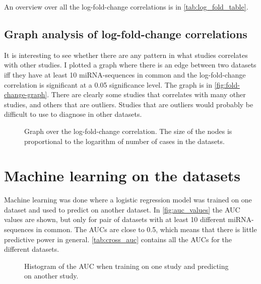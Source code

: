 An overview over all the log-fold-change correlations is in \autoref{tab:log_fold_table}.

\subsection{Graph analysis of log-fold-change correlations}

It is interesting to see whether there are any pattern in what studies correlates with other studies. I plotted a graph where there is an edge between two datasets iff they have at least 10 miRNA-sequences in common and the log-fold-change correlation is significant at a 0.05 significance level. The graph is in \autoref{fig:fold-change-graph}. There are clearly some studies that correlates with many other studies, and others that are outliers. Studies that are outliers would probably be difficult to use to diagnose in other datasets.

\begin{figure}
    \centering
    
    \caption{Graph over the log-fold-change correlation. The size of the nodes is proportional to the logarithm of number of cases in the datasets.}
    \label{fig:fold-change-graph}
\end{figure}


\section{Machine learning on the datasets}

Machine learning was done where a logistic regression model was trained on one dataset and used to predict on another dataset. In \autoref{fig:auc_values} the AUC values are shown, but only for pair of datasets with at least 10 different miRNA-sequences in common.
The AUCs are close to 0.5, which means that there is little predictive power in general.
\autoref{tab:cross_auc} contains all the AUCs for the different datasets.

\begin{figure}
    \centering
    \caption{Histogram of the AUC when training on one study and predicting on another study.}
    \label{fig:auc_values}
\end{figure}


